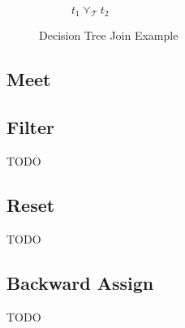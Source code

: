\documentclass[11pt,a4paper,titlepage]{article}
\begin{document}
\begin{figure}
\begin{subfigure}[b]{0.5\textwidth}
        \caption{$t_1 \curlyvee_{\mathcal{T}} t_2$}
    \end{subfigure}

    \caption{Decision Tree Join Example}
    \label{fig:decision_tree_join_example}
\end{figure}

\subsection{Meet}\label{sec:tree_meet}

\subsection{Filter}
TODO

\subsection{Reset}
TODO

\subsection{Backward Assign}
TODO
\end{document}

